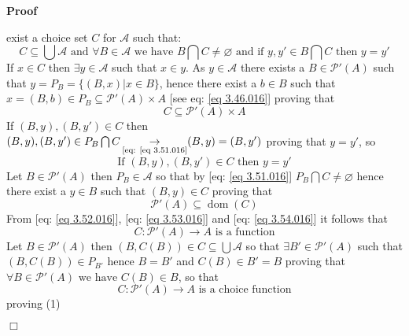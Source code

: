 \documentclass{book}
\newcommand{\Rightarrowlim}{\mathop{\rightarrow}\limits}
\newcommand{\tmop}[1]{\ensuremath{\operatorname{#1}}}
\newenvironment{proof}{\noindent\textbf{Proof\ }}{\hspace*{\fill}$\Box$\medskip}
\begin{document}
\begin{proof}
\begin{description}
    exist a choice set $C$ for $\mathcal{A}$ such that:
    \begin{equation}
      \label{eq 3.51.016} C \subseteq \bigcup \mathcal{A} \text{ and } \forall
      B \in \mathcal{A} \text{ we have $B \bigcap C \neq \varnothing$ and if
      $y, y' \in B \bigcap C \text{ then } y = y'$}
    \end{equation}
    If $x \in C$ then $\exists y \in \mathcal{A}$ such that $x \in y$. As $y
    \in \mathcal{A}$ there exists a $B \in \mathcal{P}' (A)$ such that $y =
    P_B = \{ (B, x) |x \in B \}$, hence there exist a $b \in B$ such that $x =
    (B, b) \in P_B \subseteq \mathcal{P}' (A) \times A$ [see eq: \ref{eq
    3.46.016}] proving that
    \begin{equation}
      \label{eq 3.52.016} C \subseteq \mathcal{P}' (A) \times A
    \end{equation}
    If $(B, y), (B, y') \in C$ then $(B, y), (B, y') \in P_B \bigcap C
    \Rightarrowlim_{\text{[eq: \ref{eq 3.51.016}}} (B, y) = (B, y')$ proving
    that $y = y'$, so
    \begin{equation}
      \label{eq 3.53.016} \text{If } (B, y), (B, y') \in C \text{ then } y =
      y'
    \end{equation}
    Let $B \in \mathcal{P}' (A)$ then $P_B \in \mathcal{A}$ so that by [eq:
    \ref{eq 3.51.016}] $P_B \bigcap C \neq \varnothing$ hence there exist a $y
    \in B$ such that $(B, y) \in C$ proving that
    \begin{equation}
      \label{eq 3.54.016} \mathcal{P}' (A) \subseteq \tmop{dom} (C)
    \end{equation}
    From [eq: \ref{eq 3.52.016}], [eq: \ref{eq 3.53.016}] and [eq: \ref{eq
    3.54.016}] it follows that
    \begin{equation}
      \label{eq 3.55.016} C : \mathcal{P}' (A) \rightarrow A \text{ is a
      function}
    \end{equation}
    Let $B \in \mathcal{P}' (A)$ then $(B, C (B)) \in C \subseteq \bigcup
    \mathcal{A}$ so that $\exists B' \in \mathcal{P}' (A)$ such that $(B, C
    (B)) \in P_{B'}$ hence $B = B'$ and $C (B) \in B' = B$ proving that
    $\forall B \in \mathcal{P}' (A) \text{ we have } C (B) \in B$, so that
    \[ C : \mathcal{P}' (A) \rightarrow A \text{ is a choice function} \]
    proving (1)
    

\end{description}
\end{proof}
\end{document}
